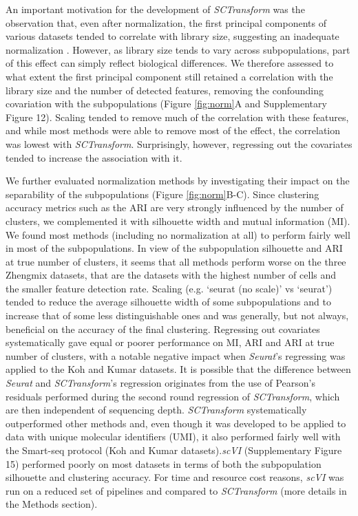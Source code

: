 \documentclass{bmcart}
\begin{document}
An important motivation for the development of \textit{SCTransform} was the observation that, even after normalization, the first principal components of various datasets tended to correlate with library size, suggesting an inadequate normalization \cite{hafemeisterSCtransform2019}. However, as library size tends to vary across subpopulations, part of this effect can simply reflect biological differences. We therefore assessed to what extent the first principal component still retained a correlation with the library size and the number of detected features, removing the confounding covariation with the subpopulations (Figure \ref{fig:norm}A and Supplementary Figure 12). Scaling tended to remove much of the correlation with these features, and while most methods were able to remove most of the effect, the correlation was lowest with \textit{SCTransform}. Surprisingly, however, regressing out the covariates tended to increase the association with it.

We further evaluated normalization methods by investigating their impact on the separability of the subpopulations (Figure \ref{fig:norm}B-C). Since clustering accuracy metrics such as the ARI are very strongly influenced by the number of clusters, we complemented it with silhouette width \cite{RousseeuwSil1987} and mutual information (MI). We found most methods (including no normalization at all) to perform fairly well in most of the subpopulations. In view of the subpopulation silhouette and ARI at true number of clusters, it seems that all methods perform worse on the three Zhengmix datasets, that are the datasets with the highest number of cells and the smaller feature detection rate. Scaling (e.g. `seurat (no scale)' vs `seurat') tended to reduce the average silhouette width of some subpopulations and to increase that of some less distinguishable ones and was generally, but not always, beneficial on the accuracy of the final clustering. Regressing out covariates systematically gave equal  or poorer performance on MI, ARI and ARI at true number of clusters, with a notable negative impact when \textit{Seurat}'s regressing was applied to the Koh and Kumar datasets. It is possible that the difference between \textit{Seurat} and \textit{SCTransform}'s regression originates from the use of Pearson's residuals performed during the second round regression of \textit{SCTransform}, which are then independent of sequencing depth. \textit{SCTransform} systematically outperformed other methods and, even though it was developed to be applied to data with unique molecular identifiers (UMI), it also performed fairly well with the Smart-seq protocol (Koh and Kumar datasets).\textit{scVI} (Supplementary Figure 15) performed poorly on most datasets in terms of both the subpopulation silhouette and clustering accuracy. For time and resource cost reasons, \textit{scVI} was run on a reduced set of pipelines and compared to \textit{SCTransform} (more details in the Methods section).
\end{document}
